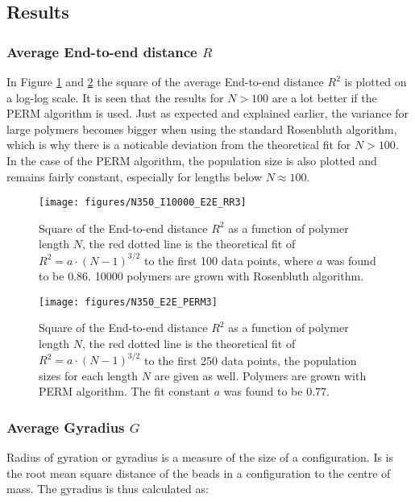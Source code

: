 \subsection*{Results}
\subsubsection*{Average End-to-end distance $R$}

In Figure \ref{fig:etoe_rr} and \ref{fig:etoe_perm} the square of the average End-to-end distance $R^2$ is plotted on a log-log scale. It is seen that the results for $N>100$ are a lot better if the PERM algorithm is used. Just as expected and explained earlier, the variance for large polymers becomes bigger when using the standard Rosenbluth algorithm, which is why there is a noticable deviation from the theoretical fit for $N>100$. In the case of the PERM algorithm, the population size is also plotted and remains fairly constant, especially for lengths below $N \approx 100$.

\begin{figure}[ht!]
\centering
\texttt{[image: figures/N350\_I10000\_E2E\_RR3]}
\caption{Square of the End-to-end distance $R^2$ as a function of polymer length $N$, the red dotted line is the theoretical fit of $R^2=a\cdot \left(N-1\right)^{3/2}$ to the first 100 data points, where $a$ was found to be $0.86$. 10000 polymers are grown with Rosenbluth algorithm.}
\label{fig:etoe_rr}
\end{figure}

\begin{figure}[ht!]
\centering
\texttt{[image: figures/N350\_E2E\_PERM3]}
\caption{Square of the End-to-end distance $R^2$ as a function of polymer length $N$, the red dotted line is the theoretical fit of $R^2=a\cdot \left(N-1\right)^{3/2}$ to the first 250 data points, the population sizes for each length $N$ are given as well. Polymers are grown with PERM algorithm. The fit constant $a$ was found to be $0.77$.}
\label{fig:etoe_perm}
\end{figure}

\subsubsection*{Average Gyradius $G$}

Radius of gyration or gyradius is a measure of the size of a configuration. Is is the root mean square distance of the beads in a configuration to the centre of mass. The gyradius is thus calculated as:

